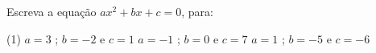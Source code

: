 \begin{question} 
Escreva a equação $ax^2+bx+c=0$, para:

\begin{tasks}(1)
        \task $a=3$ ; $b=-2$ e $c=1$
        \task $a=-1$ ; $b=0$ e $c=7$
        \task $a=1$ ; $b=-5$ e $c=-6$   
    \end{tasks}
\end{question}


   